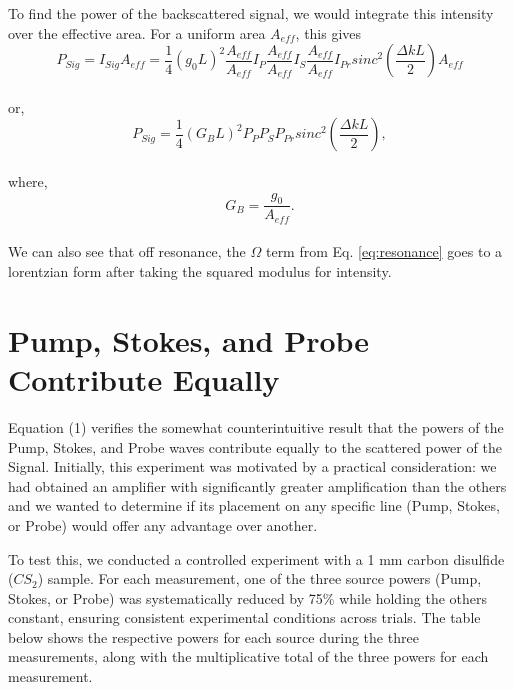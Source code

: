 \documentclass[%
  reprint,
  superscriptaddress,
  amsmath,amssymb,
  aps,
  prapplied,
]{revtex4-2}
\begin{document}
To find the power of the backscattered signal, we would integrate this intensity over the effective area. For a uniform area $A_{eff}$, this gives
\\
\begin{equation}
  P_{Sig} = I_{Sig}A_{eff} = \frac{1}{4}(g_{0}L)^{2}\frac{A_{eff}}{A_{eff}}I_{P}\frac{A_{eff}}{A_{eff}}I_{S}\frac{A_{eff}}{A_{eff}}I_{Pr}sinc^{2}\left(\frac{\Delta kL}{2}\right)A_{eff}
\end{equation}
\\
or,
\\
\begin{equation}
  P_{Sig} = \frac{1}{4}(G_{B}L)^{2}P_{P}P_{S}P_{Pr}sinc^{2}\left(\frac{\Delta kL}{2}\right),
\end{equation}
\\
where,
\\
\begin{equation}
  G_{B} = \frac{g_{0}}{A_{eff}}.
\end{equation}
\\
We can also see that off resonance, the $\Omega$ term from Eq. \ref{eq:resonance} goes to a lorentzian form after taking the squared modulus for intensity.

\newpage

\section{Pump, Stokes, and Probe Contribute Equally}

Equation (1) verifies the somewhat counterintuitive result that the powers of the Pump, Stokes, and Probe waves contribute equally to the scattered power of the Signal. Initially, this experiment was motivated by a practical consideration: we had obtained an amplifier with significantly greater amplification than the others and we wanted to determine if its placement on any specific line (Pump, Stokes, or Probe) would offer any advantage over another.

To test this, we conducted a controlled experiment with a 1 mm carbon disulfide ($CS_{2}$) sample. For each measurement, one of the three source powers (Pump, Stokes, or Probe) was systematically reduced by 75\% while holding the others constant, ensuring consistent experimental conditions across trials. The table below shows the respective powers for each source during the three measurements, along with the multiplicative total of the three powers for each measurement.
\end{document}
